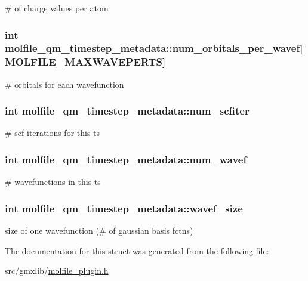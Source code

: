 \# of charge values per atom \hypertarget{structmolfile__qm__timestep__metadata_ac8c5cc92d4a4f5c5214b15fcce1b6f29}{
\subsubsection[{num\-\_\-orbitals\-\_\-per\-\_\-wavef}]{\setlength{\rightskip}{0pt plus 5cm}int {\bf molfile\-\_\-qm\-\_\-timestep\-\_\-metadata\-::num\-\_\-orbitals\-\_\-per\-\_\-wavef}\mbox{[}{\bf \-M\-O\-L\-F\-I\-L\-E\-\_\-\-M\-A\-X\-W\-A\-V\-E\-P\-E\-R\-T\-S}\mbox{]}}}\label{structmolfile__qm__timestep__metadata_ac8c5cc92d4a4f5c5214b15fcce1b6f29}
\# orbitals for each wavefunction \hypertarget{structmolfile__qm__timestep__metadata_a4e7783257a629101ac0af86272df620b}{
\subsubsection[{num\-\_\-scfiter}]{\setlength{\rightskip}{0pt plus 5cm}int {\bf molfile\-\_\-qm\-\_\-timestep\-\_\-metadata\-::num\-\_\-scfiter}}}\label{structmolfile__qm__timestep__metadata_a4e7783257a629101ac0af86272df620b}
\# scf iterations for this ts \hypertarget{structmolfile__qm__timestep__metadata_a23b966cad1751b3063a2c4c7e812e3e9}{
\subsubsection[{num\-\_\-wavef}]{\setlength{\rightskip}{0pt plus 5cm}int {\bf molfile\-\_\-qm\-\_\-timestep\-\_\-metadata\-::num\-\_\-wavef}}}\label{structmolfile__qm__timestep__metadata_a23b966cad1751b3063a2c4c7e812e3e9}
\# wavefunctions in this ts \hypertarget{structmolfile__qm__timestep__metadata_a9d9a6788a8e7b19f4be71b9b4ef5fe43}{
\subsubsection[{wavef\-\_\-size}]{\setlength{\rightskip}{0pt plus 5cm}int {\bf molfile\-\_\-qm\-\_\-timestep\-\_\-metadata\-::wavef\-\_\-size}}}\label{structmolfile__qm__timestep__metadata_a9d9a6788a8e7b19f4be71b9b4ef5fe43}
size of one wavefunction (\# of gaussian basis fctns) 

\-The documentation for this struct was generated from the following file\-:\begin{DoxyCompactItemize}
\item 
src/gmxlib/\hyperlink{molfile__plugin_8h}{molfile\-\_\-plugin.\-h}\end{DoxyCompactItemize}
